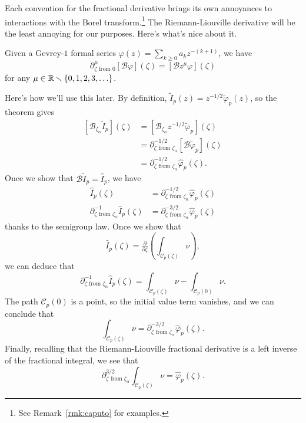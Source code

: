 \documentclass[11pt,a4paper,twoside,leqno,noamsfonts]{amsart}
\numberwithin{equation}{section}
\newcommand{\borel}{\mathcal{B}}
\begin{document}
Each convention for the fractional derivative brings its own annoyances to interactions with the Borel transform.\footnote{See Remark~\ref{rmk:caputo} for examples.} The Riemann-Liouville derivative will be the least annoying for our purposes. Here's what's nice about it.
\begin{theorem}\label{thm:frac-diff-borel}
Given a Gevrey-$1$ formal series $\varphi(z) = \sum_{k \ge 0}a_kz^{-(k+1)}$, we have
\[ \partial^\mu_{\zeta \text{ from } 0} \left[ \borel \varphi \right](\zeta) = \left[ \borel z^\mu \varphi \right](\zeta) \]
for any $\mu \in \mathbb R \smallsetminus \{0, 1, 2, 3, \ldots\}$.
\end{theorem}
\color{Turquoise}
Here's how we'll use this later. By definition, $\tilde{I}_p(z) = z^{-1/2}\tilde{\varphi}_p(z)$, so the theorem gives
\begin{align*}
\left[ \borel_{\zeta_\alpha} \tilde{I}_p \right](\zeta) & = \left[ \borel_{\zeta_\alpha} z^{-1/2} \tilde{\varphi}_p \right](\zeta) \\
& = \partial^{-1/2}_{\zeta \text{ from } \zeta_\alpha} \left[ \borel \tilde{\varphi}_p \right](\zeta) \\
& = \partial^{-1/2}_{\zeta \text{ from } \zeta_\alpha} \hat{\varphi}_p(\zeta).
\end{align*}
Once we show that $\borel \tilde{I}_p = \hat{I}_p$, we have
\begin{align*}
\hat{I}_p(\zeta) & = \partial^{-1/2}_{\zeta \text{ from } \zeta_\alpha} \hat{\varphi}_p(\zeta) \\
\partial^{-1}_{\zeta \text{ from } \zeta_\alpha} \hat{I}_p(\zeta) & = \partial^{-3/2}_{\zeta \text{ from } \zeta_\alpha} \hat{\varphi}_p(\zeta)
\end{align*}
thanks to the semigroup law. Once we show that
\[ \hat{I}_p(\zeta) = \tfrac{\partial}{\partial \zeta} \left( \int_{\mathcal{C}_p(\zeta)} \nu \right), \]
we can deduce that
\[ \partial^{-1}_{\zeta \text{ from } \zeta_\alpha} \hat{I}_p(\zeta) = \int_{\mathcal{C}_p(\zeta)} \nu - \int_{\mathcal{C}_p(0)} \nu. \]
The path $\mathcal{C}_p(0)$ is a point, so the initial value term vanishes, and we can conclude that
\[ \int_{\mathcal{C}_p(\zeta)} \nu = \partial^{-3/2}_{\zeta \text{ from } \zeta_\alpha} \hat{\varphi}_p(\zeta). \]
Finally, recalling that the Riemann-Liouville fractional derivative is a left inverse of the fractional integral, we see that
\[ \partial^{3/2}_{\zeta \text{ from } \zeta_\alpha} \int_{\mathcal{C}_p(\zeta)} \nu = \hat{\varphi}_p(\zeta). \]
\color{black}
\end{document}
